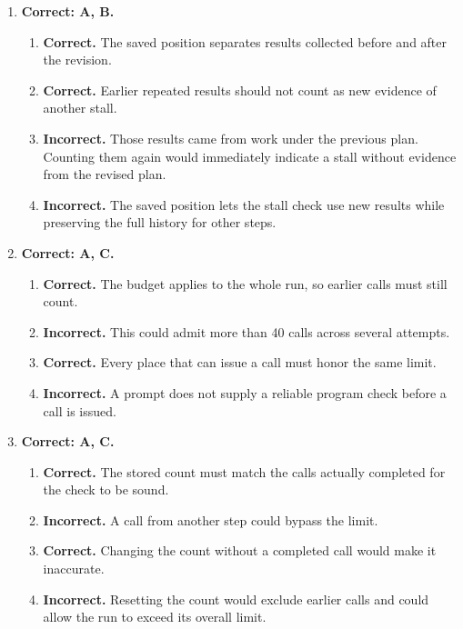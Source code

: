 \begin{enumerate}[start=11,itemsep=0.7\baselineskip]
\item[{\hyperref[exercise:17]{17.}}] \begin{minipage}[t]{\linewidth}
\textbf{Correct: A, B.}
\begin{enumerate}[label=\textnormal{(\Alph*)},leftmargin=*,itemsep=0pt]
\item \textbf{Correct.} The saved position separates results collected before and after the revision.
\item \textbf{Correct.} Earlier repeated results should not count as new evidence of another stall.
\item \textbf{Incorrect.} Those results came from work under the previous plan. Counting them again would immediately indicate a stall without evidence from the revised plan.
\item \textbf{Incorrect.} The saved position lets the stall check use new results while preserving the full history for other steps.
\end{enumerate}
\end{minipage}

\item[{\hyperref[exercise:18]{18.}}] \begin{minipage}[t]{\linewidth}
\textbf{Correct: A, C.}
\begin{enumerate}[label=\textnormal{(\Alph*)},leftmargin=*,itemsep=0pt]
\item \textbf{Correct.} The budget applies to the whole run, so earlier calls must still count.
\item \textbf{Incorrect.} This could admit more than 40 calls across several attempts.
\item \textbf{Correct.} Every place that can issue a call must honor the same limit.
\item \textbf{Incorrect.} A prompt does not supply a reliable program check before a call is issued.
\end{enumerate}
\end{minipage}

\item[{\hyperref[exercise:19]{19.}}] \begin{minipage}[t]{\linewidth}
\textbf{Correct: A, C.}
\begin{enumerate}[label=\textnormal{(\Alph*)},leftmargin=*,itemsep=0pt]
\item \textbf{Correct.} The stored count must match the calls actually completed for the check to be sound.
\item \textbf{Incorrect.} A call from another step could bypass the limit.
\item \textbf{Correct.} Changing the count without a completed call would make it inaccurate.
\item \textbf{Incorrect.} Resetting the count would exclude earlier calls and could allow the run to exceed its overall limit.
\end{enumerate}
\end{minipage}


\end{enumerate}

